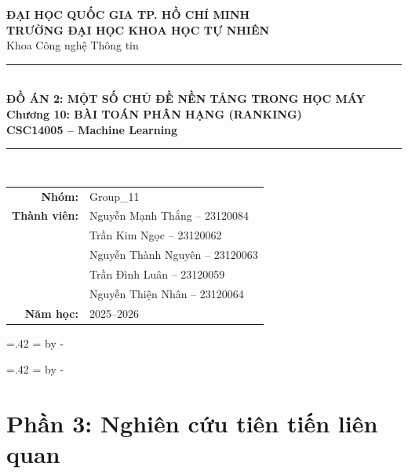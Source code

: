 \documentclass[12pt,a4paper]{article}
\makeatletter
\newcommand{\sectionbreakifneeded}{%
  \par
  \begingroup
  \dimen@=.42\textheight
  \dimen@ii=\pagegoal
  \advance\dimen@ii by -\pagetotal
  \ifdim\dimen@>\dimen@ii\newpage\fi
  \endgroup
}
\makeatother
\begin{document}
\begin{titlepage}
\thispagestyle{empty}
\centering
\vspace*{1.15cm}
{\Large \textbf{ĐẠI HỌC QUỐC GIA TP. HỒ CHÍ MINH}}\\[0.15cm]
{\Large \textbf{TRƯỜNG ĐẠI HỌC KHOA HỌC TỰ NHIÊN}}\\[0.25cm]
{\large Khoa Công nghệ Thông tin}\\[2.0cm]

{\color{HCMUSBlue}\rule{0.68\linewidth}{0.7pt}}\\[0.75cm]
{\fontsize{20}{20}\selectfont\bfseries\color{HCMUSBlue} ĐỒ ÁN 2: MỘT SỐ CHỦ ĐỀ NỀN TẢNG TRONG HỌC MÁY}\\[0.45cm]
{\fontsize{20}{20}\selectfont\bfseries\color{HCMUSBlue} Chương 10: BÀI TOÁN PHÂN HẠNG (RANKING)}\\[0.45cm]
{\Large\bfseries CSC14005 -- Machine Learning}\\[0.35cm]
{\color{HCMUSBlue}\rule{0.68\linewidth}{0.7pt}}\\[1.4cm]

\begin{tabular}{rl}
\textbf{Nhóm:} & Group\_11 \\[4pt]
\textbf{Thành viên:} & Nguyễn Mạnh Thắng -- 23120084 \\
& Trần Kim Ngọc -- 23120062 \\
& Nguyễn Thành Nguyên -- 23120063 \\
& Trần Đình Luân -- 23120059 \\
& Nguyễn Thiện Nhân -- 23120064 \\[4pt]
\textbf{Năm học:} & 2025--2026
\end{tabular}

\vfill
\end{titlepage}

\tableofcontents
\newpage









\sectionbreakifneeded


\sectionbreakifneeded
\section{Phần 3: Nghiên cứu tiên tiến liên quan}
\end{document}
